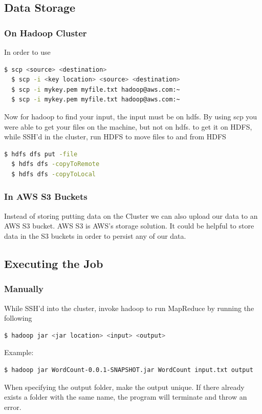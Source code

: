 \documentclass{article}
\begin{document}
\subsection{Data Storage}
\subsubsection{On Hadoop Cluster}
In order to use
\begin{lstlisting}[language=bash]
  $ scp <source> <destination>
  $ scp -i <key location> <source> <destination>
  $ scp -i mykey.pem myfile.txt hadoop@aws.com:~
  $ scp -i mykey.pem myfile.txt hadoop@aws.com:~
\end{lstlisting}
Now for hadoop to find your input, the input must be on hdfs. By using scp you were able to get your files on the machine, but not on hdfs. to get it on HDFS, while SSH'd in the cluster, run HDFS to move files to and from HDFS
\begin{lstlisting}[language=bash]
  $ hdfs dfs put -file 
  $ hdfs dfs -copyToRemote
  $ hdfs dfs -copyToLocal
\end{lstlisting}
\subsubsection{In AWS S3 Buckets}
Instead of storing putting data on the Cluster we can also upload our data to an AWS S3 bucket. AWS S3 is AWS's storage solution. It could be helpful to store data in the S3 buckets in order to persist any of our data.
\subsection{Executing the Job}
\subsubsection{Manually}
While SSH'd into the cluster, invoke hadoop to run MapReduce by running the following
\begin{lstlisting}[language=bash]
  $ hadoop jar <jar location> <input> <output>
\end{lstlisting}
Example:
\begin{lstlisting}[language=bash]
  $ hadoop jar WordCount-0.0.1-SNAPSHOT.jar WordCount input.txt output
\end{lstlisting}
\begin{info}
When specifying the output folder, make the output unique. If there already exists a folder with the same name, the program will terminate and throw an error. 
\end{info}
\end{document}
